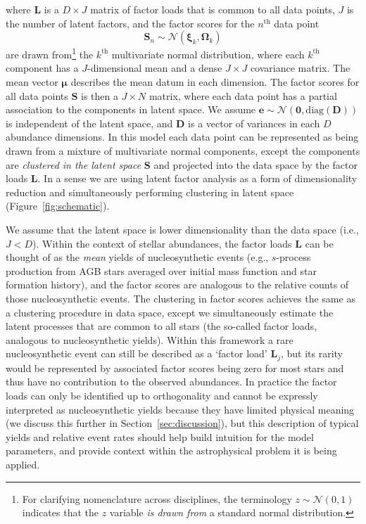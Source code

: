 \documentclass[twocolumn]{aastex62}
\newcommand{\vect}[1]{\boldsymbol{\mathbf{#1}}}
\renewcommand{\vec}[1]{\vect{#1}}
\newcommand{\factorloads}{\textbf{L}}
\newcommand{\factorscores}{\textbf{S}}
\newcommand{\specificvariance}{\vec{D}}
\newcommand{\NumData}{N}
\newcommand{\NumDimensions}{D}
\newcommand{\numdata}{n}
\newcommand{\NumLatentFactors}{J}
\newcommand{\numlatentfactors}{j}
\newcommand{\numcomponents}{k}
\begin{document}
\noindent{}where $\factorloads$ is a $\NumDimensions \times \NumLatentFactors$ 
matrix of factor loads that is common to all data points, $\NumLatentFactors$ is
the number of latent factors, and the factor scores 
for the $\numdata^\mathrm{th}$ data point
\begin{equation}
	\factorscores_\numdata \sim \mathcal{N}(\vec\xi_\numcomponents, \vec\Omega_\numcomponents)
\end{equation}
\noindent{}are drawn from\footnote{For clarifying nomenclature across disciplines, the terminology $z \sim \mathcal{N}(0, 1)$ indicates that the $z$ variable \emph{is drawn from} a standard normal distribution.} the $\numcomponents^\mathrm{th}$ multivariate
normal distribution, where each $\numcomponents^\mathrm{th}$ component has a $\NumLatentFactors$-dimensional mean and a dense $\NumLatentFactors \times \NumLatentFactors$ covariance matrix.
The mean vector $\vec\mu$ describes the mean datum in each dimension.
The factor scores for all data points $\factorscores$ is then a 
$\NumLatentFactors \times \NumData$ matrix, where each data point has a partial
association to the components in latent space. 
We assume $\vec{e} \sim \mathcal{N}\left(\vec{0}, \textrm{diag}(\specificvariance)\right)$
is independent of the latent space, and $\specificvariance$ is a
vector of variances in each $\NumDimensions$ abundance dimensions.
In this model each data point can be represented as being drawn
from a mixture of multivariate normal components, except the components
are \emph{clustered in the latent space} $\factorscores$ and projected
into the data space by the factor loads $\factorloads$. In a sense we
are using latent factor analysis as a form of dimensionality reduction and
simultaneously performing clustering in latent space (Figure~\ref{fig:schematic}).


We assume that the latent space is lower dimensionality than the
data space (i.e., $\NumLatentFactors < \NumDimensions$).
Within the context of stellar abundances, the factor loads
$\factorloads$ can be thought of as the \emph{mean} yields
of nucleosynthetic
events (e.g., $s$-process production from AGB stars averaged over
initial mass function and star formation history), and the
factor scores are analogous to the relative counts of those 
nucleosynthetic events. The clustering in factor scores
achieves the same as a clustering procedure in data space,
except we simultaneously estimate the latent processes that are
common to all stars (the so-called factor loads, analogous to 
nucleosynthetic yields). Within this framework a rare nucleosynthetic event
can still be described as a `factor load' $\factorloads_\numlatentfactors$, 
but its rarity would be represented by associated factor
scores being zero for most stars and thus have no contribution
to the observed abundances. In practice the factor loads can only be 
identified up to orthogonality and cannot be expressly interpreted as
nucleosynthetic yields because they have limited physical meaning
(we discuss this further in Section~\ref{sec:discussion}),
but this description of typical yields and relative event rates should
help build intuition for the model parameters, and provide context
within the astrophysical problem it is being applied.
\end{document}
